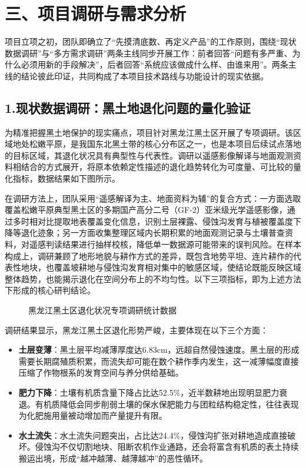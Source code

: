 \section{三、项目调研与需求分析}

项目立项之初，团队即确立了“先摸清底数、再定义产品”的工作原则，围绕“现状数据调研”与“多方需求调研”两条主线同步开展工作：前者回答“问题有多严重、为什么必须用新的手段解决”，后者回答“系统应该做成什么样、由谁来用”。两条主线的结论彼此印证，共同构成了本项目技术路线与功能设计的现实依据。

\subsection{1.现状数据调研：黑土地退化问题的量化验证}

为精准把握黑土地保护的现实痛点，项目针对黑龙江黑土区开展了专项调研。该区域地处松嫩平原，是我国东北黑土带的核心分布区之一，也是本项目后续试点落地的目标区域，其退化状况具有典型性与代表性。调研以遥感影像解译与地面观测资料相结合的方式展开，将原本依赖定性描述的退化趋势转化为可度量、可比较的量化指标，数据结果如下图所示。

在调研方法上，团队采用“遥感解译为主、地面资料为辅”的复合方式：一方面选取覆盖松嫩平原典型黑土区的多期国产高分二号（GF-2）亚米级光学遥感影像，通过多时相对比提取地表覆盖变化信息，识别土层裸露、侵蚀沟发育与植被覆盖度下降等退化迹象；另一方面收集整理区域内长期积累的地面观测记录与土壤普查资料，对遥感判读结果进行抽样校核，降低单一数据源可能带来的误判风险。在样本构成上，调研兼顾了地形地貌与耕作方式的差异，既包含地势平坦、连片耕作的代表性地块，也覆盖坡耕地与侵蚀沟发育相对集中的敏感区域，使结论既能反映区域整体趋势，也能揭示退化在空间分布上的不均匀性。以下三项指标，即为上述方法下形成的核心研判结论。

\begin{figure}[htbp]
    \centering
    \caption{黑龙江黑土区退化状况专项调研统计数据}
    \label{fig:img2}
\end{figure}

调研结果显示，黑龙江黑土区退化形势严峻，主要体现在以下三个方面：

\begin{itemize}
    \item \textbf{土层变薄}：黑土层平均减薄厚度达6.83cm，远超自然侵蚀速度。黑土层的形成需要长期腐殖质积累，而流失却可能在数个耕作季内发生，这一减薄幅度直接压缩了作物根系的发育空间与养分供给基础。
    \item \textbf{肥力下降}：土壤有机质含量下降占比达52.5\%，近半数耕地出现明显肥力衰退。有机质降低会同步削弱土壤的保水保肥能力与团粒结构稳定性，往往表现为化肥施用量被动增加而产量提升有限。
    \item \textbf{水土流失}：水土流失问题突出，占比达24.4\%，侵蚀沟扩张对耕地造成直接破坏。侵蚀沟不仅切割地块、阻断农机作业通路，还会将富含有机质的表土持续搬运出境，形成“越冲越薄、越薄越冲”的恶性循环。
\end{itemize}

